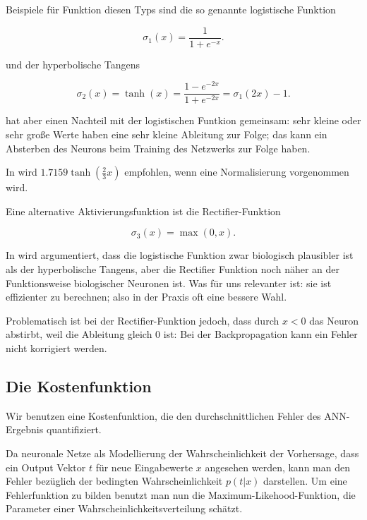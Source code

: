 Beispiele für Funktion diesen Typs sind die so genannte logistische Funktion

\begin{equation}
\sigma_1(x) = \frac{1}{1+e^{-x}}.
\end{equation}

und der hyperbolische Tangens

\begin{equation}
\sigma_2(x) = \tanh(x) = \frac{1-e^{-2x}}{1+e^{-2x}} = 
\sigma_1(2x) -1.
\end{equation}

hat aber einen Nachteil mit der logistischen Funtkion gemeinsam: sehr kleine oder sehr große Werte haben eine sehr kleine Ableitung zur Folge; das kann ein Absterben des Neurons beim Training des Netzwerks zur Folge haben. 

In \cite{lecunefficient} wird $1.7159 \tanh(\frac{2}{3} x)$ empfohlen, wenn eine Normalisierung vorgenommen wird. 

Eine alternative Aktivierungsfunktion ist die Rectifier-Funktion 

\begin{equation}
\sigma_3(x) = \max(0,x).
\end{equation} 

In \cite{glorot2011deep} wird argumentiert, dass die logistische Funktion zwar biologisch plausibler ist als der hyperbolische Tangens, aber die Rectifier Funktion noch näher an der Funktionsweise biologischer Neuronen ist. Was für uns relevanter ist: sie ist effizienter zu berechnen; also in der Praxis oft eine bessere Wahl. 

Problematisch ist bei der Rectifier-Funktion jedoch, dass durch $x < 0$ das Neuron abstirbt, weil die Ableitung gleich 0 ist: Bei der Backpropagation kann ein Fehler nicht korrigiert werden\cite{bengio2012practical}.


\subsection{Die Kostenfunktion}
Wir benutzen eine Kostenfunktion, die den durchschnittlichen Fehler des ANN-Ergebnis quantifiziert.

Da neuronale Netze als Modellierung der Wahrscheinlichkeit der Vorhersage, dass ein Output Vektor $t$ für neue Eingabewerte $x$ angesehen werden, kann man den Fehler bezüglich der bedingten Wahrscheinlichkeit $p(t|x)$ darstellen. 
Um eine Fehlerfunktion zu bilden benutzt man nun die Maximum-Likehood-Funktion, die Parameter einer Wahrscheinlichkeitsverteilung schätzt. 

